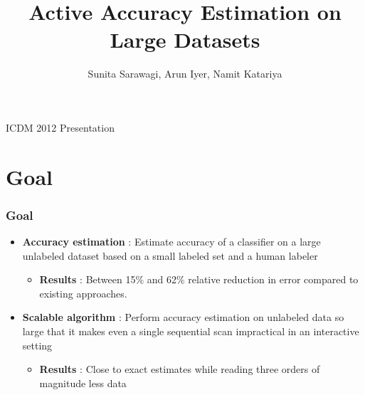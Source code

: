 \documentclass[11pt]{beamer}
\title[]{Active Accuracy Estimation on Large Datasets}
\author {Sunita Sarawagi, Arun Iyer, Namit Katariya}
\newlength{\wideitemsep}
\let\olditem\item
\renewcommand{\item}{\setlength{\itemsep}{\wideitemsep}\olditem}
\begin{document}
\begin{frame}
\titlepage
\begin{center}
\large{ICDM 2012 Presentation} \\ \vspace*{10pt}
\end{center}
\end{frame}




\section{Goal}
\begin{frame}
\frametitle{Goal}
\begin{itemize}
\item \textbf{Accuracy estimation} : Estimate accuracy of a classifier on a large unlabeled dataset based on a small labeled set and a human labeler \vspace*{3mm}
\begin{itemize}
\item \textbf{Results} : Between 15\% and 62\% relative reduction in error compared to existing approaches. 
\end{itemize} \vspace*{3mm}
\item \textbf{Scalable algorithm} : Perform accuracy estimation on unlabeled data so large that it makes even a single sequential scan impractical in an interactive setting \vspace*{3mm}
\begin{itemize}
\item \textbf{Results} : Close to exact estimates while reading three orders of magnitude less data
\end{itemize}
\end{itemize}
\end{frame}
\end{document}

